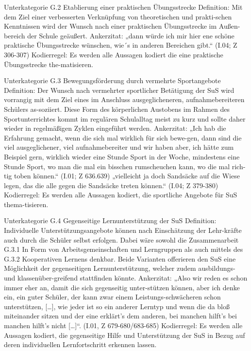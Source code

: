 Unterkategorie G.2 Etablierung einer praktischen Übungsstrecke
Definition: Mit dem Ziel einer verbesserten Verknüpfung von theoretischen und prakti-schen Kenntnissen wird der Wunsch nach einer praktischen Übungsstrecke im Außen-bereich der Schule geäußert.
Ankerzitat: „dann würde ich mir hier ene schöne praktische Übungsstrecke wünschen, wie´s in anderen Bereichen gibt.“ (I.04; Z 306-307)
Kodierregel: Es werden alle Aussagen kodiert die eine praktische Übungsstrecke the-matisieren.

Unterkategorie G.3 Bewegungsförderung durch vermehrte Sportangebote
Definition: Der Wunsch nach vermehrter sportlicher Betätigung der SuS wird vorrangig mit dem Ziel eines im Anschluss ausgeglicheneren, aufnahmebereiteren Schülers as-soziiert. Diese Form des körperlichen Austobens im Rahmen des Sportunterrichtes kommt im regulären Schulalltag meist zu kurz und sollte daher wieder in regelmäßigen Zyklen eingeführt werden.	
Ankerzitat: „Ich hab die Erfahrung gemacht, wenn die sich mal wirklich für sich bewe-gen, dann sind die viel ausgeglichener, viel aufnahmebereiter und wir haben aber, ich hätte zum Beispiel gern, wirklich wieder eine Stunde Sport in der Woche, mindestens eine Stunde Sport, wo man die mal ein bisschen rumscheuchen kann, wo die mal rich-tig toben können.“  (I.01; Z 636.639)
„vielleicht ja doch Sandsäcke auf die Wiese legen, das die alle gegen die Sandsäcke treten können.“ (I.04; Z 379-380)
Kodierregel: Es werden alle Aussagen kodiert, die sportliche Angebote für SuS thema-tisieren.

Unterkategorie G.4 Gegenseitige Lernunterstützung der SuS
Definition: Individuelle Unterstützungsangebote können nach Einschätzung der Lehr-kräfte auch durch die Schüler selbst erfolgen. Dabei wäre sowohl die Zusammenarbeit G.3.1 In Form von Arbeitsgemeinschaften und Lerngruppen als auch mittels des G.3.2 Kooperativen Lernens denkbar. Beide Varianten offerieren den SuS eine Möglichkeit der gegenseitigen Lernunterstützung, welcher zudem ausbildungs- und klassenüber-greifend stattfinden könnte.
Ankerzitat: „Also wir reden es schon immer eher an, damit die sich gegenseitig unter-stützen können, aber ich denke ein, ein guter Schüler, der kann zwar einem Leistungs-schwächeren schon unterstützen, […], wie jeder ist so ein anderer Lerntyp und wenn die da bloß miteinander sitzen und der eine erklärt’s dem anderen, bei manchen hilft’s bei manchen hilft’s nicht […]“. (I.01, Z 679-680/683-685)
Kodierregel: Es werden alle Aussagen kodiert, die gegenseitige Hilfe und Unterstützung der SuS in Bezug auf deren individuellen Lernfortschritt erkennen lassen.

